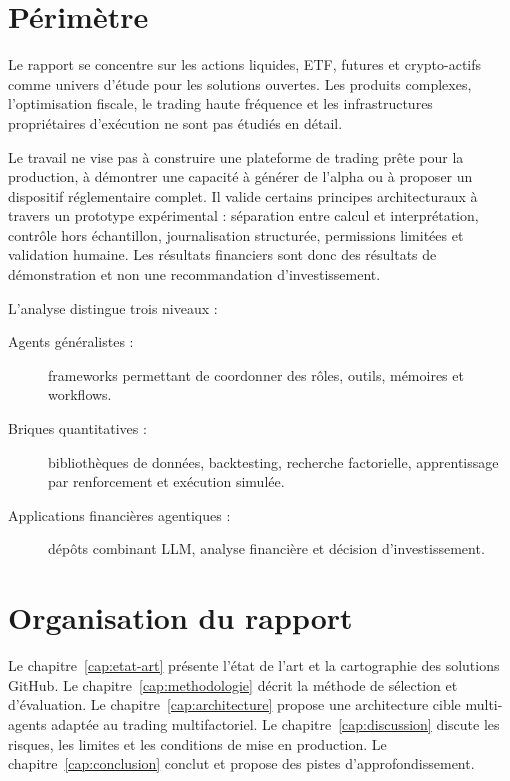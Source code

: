 \section{Périmètre}

Le rapport se concentre sur les actions liquides, ETF, futures et crypto-actifs comme univers d'étude pour les solutions ouvertes. Les produits complexes, l'optimisation fiscale, le trading haute fréquence et les infrastructures propriétaires d'exécution ne sont pas étudiés en détail.

Le travail ne vise pas à construire une plateforme de trading prête pour la production, à démontrer une capacité à générer de l'alpha ou à proposer un dispositif réglementaire complet. Il valide certains principes architecturaux à travers un prototype expérimental : séparation entre calcul et interprétation, contrôle hors échantillon, journalisation structurée, permissions limitées et validation humaine. Les résultats financiers sont donc des résultats de démonstration et non une recommandation d'investissement.

L'analyse distingue trois niveaux :
\begin{description}
    \item[Agents généralistes :] frameworks permettant de coordonner des rôles, outils, mémoires et workflows.
    \item[Briques quantitatives :] bibliothèques de données, backtesting, recherche factorielle, apprentissage par renforcement et exécution simulée.
    \item[Applications financières agentiques :] dépôts combinant LLM, analyse financière et décision d'investissement.
\end{description}

\section{Organisation du rapport}

Le chapitre~\ref{cap:etat-art} présente l'état de l'art et la cartographie des solutions GitHub. Le chapitre~\ref{cap:methodologie} décrit la méthode de sélection et d'évaluation. Le chapitre~\ref{cap:architecture} propose une architecture cible multi-agents adaptée au trading multifactoriel. Le chapitre~\ref{cap:discussion} discute les risques, les limites et les conditions de mise en production. Le chapitre~\ref{cap:conclusion} conclut et propose des pistes d'approfondissement.

